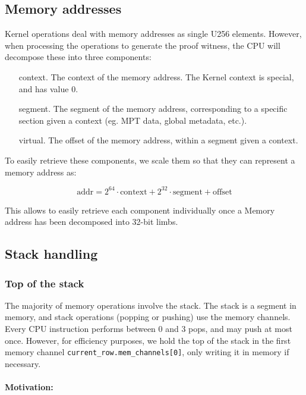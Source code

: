 \subsection{Memory addresses}
\label{memoryaddresses}

Kernel operations deal with memory addresses as single U256 elements.
However, when processing the operations to generate the proof witness, the CPU will decompose these into three components:

\begin{itemize}
  \item[context.] The context of the memory address. The Kernel context is special, and has value 0.

  \item[segment.] The segment of the memory address, corresponding to a specific section given a context (eg. MPT data, global metadata, etc.).

  \item[virtual.] The offset of the memory address, within a segment given a context.
\end{itemize}

To easily retrieve these components, we scale them so that they can represent a memory address as:

$$ \mathrm{addr} = 2^{64} \cdot \mathrm{context} + 2^{32} \cdot \mathrm{segment} + \mathrm{offset}$$

This allows to easily retrieve each component individually once a Memory address has been decomposed into 32-bit limbs.


\subsection{Stack handling}
\label{stackhandling}

\subsubsection{Top of the stack}

The majority of memory operations involve the stack. The stack is a segment in memory, and stack operations (popping or pushing) use the memory channels.
Every CPU instruction performs between 0 and 3 pops, and may push at most once. However, for efficiency purposes, we hold the top of the stack in
the first memory channel \texttt{current\_row.mem\_channels[0]}, only writing it in memory if necessary.

\paragraph*{Motivation:}

